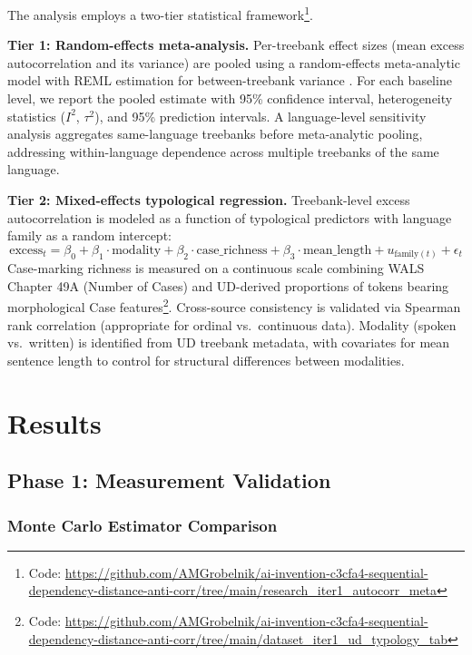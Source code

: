 \documentclass[11pt,letterpaper]{article}
\begin{document}
The analysis employs a two-tier statistical framework\footnote{Code: \url{https://github.com/AMGrobelnik/ai-invention-c3cfa4-sequential-dependency-distance-anti-corr/tree/main/research_iter1_autocorr_meta}}.

\textbf{Tier 1: Random-effects meta-analysis.} Per-treebank effect sizes (mean excess autocorrelation and its variance) are pooled using a random-effects meta-analytic model with REML estimation for between-treebank variance \citep{Veroniki2016}. For each baseline level, we report the pooled estimate with 95\% confidence interval, heterogeneity statistics ($I^2$, $\tau^2$), and 95\% prediction intervals. A language-level sensitivity analysis aggregates same-language treebanks before meta-analytic pooling, addressing within-language dependence across multiple treebanks of the same language.

\textbf{Tier 2: Mixed-effects typological regression.} Treebank-level excess autocorrelation is modeled as a function of typological predictors with language family as a random intercept:
\begin{equation}
\text{excess}_{t} = \beta_0 + \beta_1 \cdot \text{modality} + \beta_2 \cdot \text{case\_richness} + \beta_3 \cdot \text{mean\_length} + u_{\text{family}(t)} + \epsilon_t
\end{equation}
Case-marking richness is measured on a continuous scale combining WALS Chapter 49A (Number of Cases) \citep{Dryer2013} and UD-derived proportions of tokens bearing morphological Case features\footnote{Code: \url{https://github.com/AMGrobelnik/ai-invention-c3cfa4-sequential-dependency-distance-anti-corr/tree/main/dataset_iter1_ud_typology_tab}}. Cross-source consistency is validated via Spearman rank correlation (appropriate for ordinal vs.\ continuous data). Modality (spoken vs.\ written) is identified from UD treebank metadata, with covariates for mean sentence length to control for structural differences between modalities.

\section{Results}
\label{sec:results}

\subsection{Phase 1: Measurement Validation}
\label{sec:validation}

\subsubsection{Monte Carlo Estimator Comparison}
\end{document}

